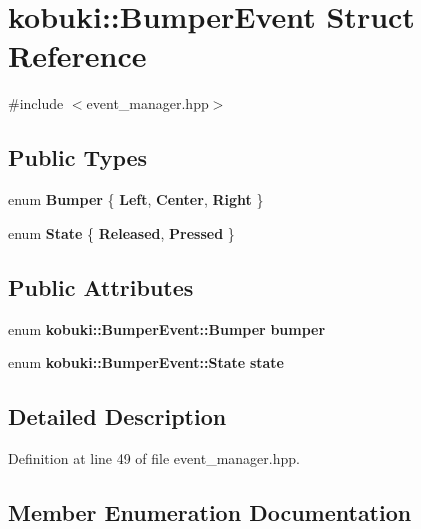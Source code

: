 \section{kobuki\-:\-:\-Bumper\-Event \-Struct \-Reference}
\label{structkobuki_1_1BumperEvent}


{\ttfamily \#include $<$event\-\_\-manager.\-hpp$>$}

\subsection*{\-Public \-Types}
\begin{DoxyCompactItemize}
\item 
enum {\bf \-Bumper} \{ {\bf \-Left}, 
{\bf \-Center}, 
{\bf \-Right}
 \}
\item 
enum {\bf \-State} \{ {\bf \-Released}, 
{\bf \-Pressed}
 \}
\end{DoxyCompactItemize}
\subsection*{\-Public \-Attributes}
\begin{DoxyCompactItemize}
\item 
enum {\bf kobuki\-::\-Bumper\-Event\-::\-Bumper} {\bf bumper}
\item 
enum {\bf kobuki\-::\-Bumper\-Event\-::\-State} {\bf state}
\end{DoxyCompactItemize}


\subsection{\-Detailed \-Description}


\-Definition at line 49 of file event\-\_\-manager.\-hpp.



\subsection{\-Member \-Enumeration \-Documentation}
